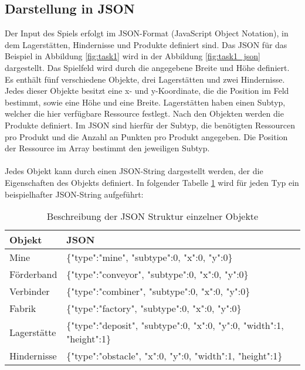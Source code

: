 \subsection{Darstellung in JSON}
Der Input des Spiels erfolgt im JSON-Format (JavaScript Object Notation), in dem Lagerstätten, Hindernisse und Produkte definiert sind. Das JSON für das Beispiel in Abbildung \ref{fig:task1} wird in der Abbildung \ref{fig:task1_json} dargestellt.
Das Spielfeld wird durch die angegebene Breite und Höhe definiert. Es enthält fünf verschiedene Objekte, drei Lagerstätten und zwei Hindernisse. Jedes dieser Objekte besitzt eine x- und y-Koordinate, die die Position im Feld bestimmt, sowie eine Höhe und eine Breite. Lagerstätten haben einen Subtyp, welcher die hier verfügbare Ressource festlegt. Nach den Objekten werden die Produkte definiert. Im JSON sind hierfür der Subtyp, die benötigten Ressourcen pro Produkt und die Anzahl an Punkten pro Produkt angegeben. Die Position der Ressource im Array bestimmt den jeweiligen Subtyp.
\\\\
Jedes Objekt kann durch einen JSON-String dargestellt werden, der die Eigenschaften des Objekts definiert. In folgender Tabelle \ref{tab:json} wird für jeden Typ ein beispielhafter JSON-String aufgeführt:

\begin{table}
	\begin{center}
		\begin{tabular}{ | l | l | } 
			\hline
			\textbf{Objekt}& \textbf{JSON}\\  \hline
			Mine & \{"type":"mine", "subtype":0, "x":0, "y":0\}\\ \hline
			Förderband & \{"type":"conveyor", "subtype":0, "x":0, "y":0\} \\ \hline
			Verbinder & \{"type":"combiner", "subtype":0, "x":0, "y":0\} \\ \hline
			Fabrik & \{"type":"factory", "subtype":0, "x":0, "y":0\}\\ \hline
			Lagerstätte & \{"type":"deposit", "subtype":0, "x":0, "y":0, "width":1, "height":1\}  \\ \hline
			Hindernisse & \{"type":"obstacle", "x":0, "y":0, "width":1, "height":1\}\\\hline
		\end{tabular}
		
		\caption{Beschreibung der JSON Struktur einzelner Objekte }\label{tab:json}
	\end{center}
\end{table}



